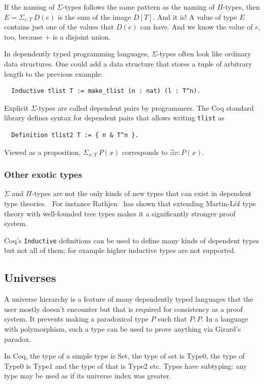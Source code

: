 \documentclass[english, 12pt, a4paper, sci, a-1b, online]{aaltothesis}
\newcommand\icoq[1]{\texttt{#1}}
\begin{document}
If the naming of $\Sigma$-types follows the same pattern as the naming of $\Pi$-types, then $E = \Sigma_{e:T}~D(e)$ is the sum of the image $D[T]$. And it is! A value of type $E$ contains just one of the values that $D(e)$ can have. And we know the value of $e$, too, because $+$ is a disjoint union.

In dependently typed programming languages, $\Sigma$-types often look like ordinary data structures. One could add a data structure that stores a tuple of arbitrary length to the previous example:
\begin{verbatim}
  Inductive tlist T := make_tlist (n : nat) (l : T^n).
\end{verbatim}
Explicit $\Sigma$-types are called dependent pairs by programmers. The Coq standard library defines syntax for dependent pairs that allows writing \icoq{tlist} as
\begin{verbatim}
  Definition tlist2 T := { n & T^n }.
\end{verbatim}

Viewed as a proposition, $\Sigma_{x:T}~P(x)$ corresponds to $\exists x : P(x)$.

\subsubsection{Other exotic types}

$\Sigma$ and $\Pi$-types are not the only kinds of new types that can exist in dependent type theories.~\cite{hofmann1997syntax} For instance Rathjen~\cite{griffor1994strength} has shown that extending Martin-Löf type theory with well-founded tree types makes it a significantly stronger proof system.

Coq's \icoq{Inductive} definitions can be used to define many kinds of dependent types but not all of them; for example higher inductive types are not supported.

\subsection{Universes}

A universe hierarchy is a feature of many dependently typed languages that the user mostly doesn't encounter but that is required for consistency as a proof system. It prevents making a paradoxical type $P$ such that $P: P$. In a language with polymorphism, such a type can be used to prove anything via Girard's paradox.

In Coq, the type of a simple type is Set, the type of set is Type0, the type of Type0 is Type1 and the type of that is Type2 etc. Types have subtyping: any type may be used as if its universe index was greater.~\cite{CPDT}
\end{document}
